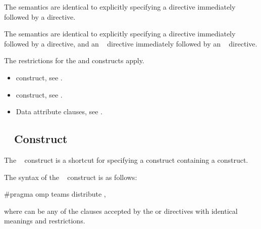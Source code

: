 \descr
\ccppspecificstart
The semantics are identical to explicitly specifying a  directive immediately 
followed by a  directive.
\ccppspecificend

\fortranspecificstart
The semantics are identical to explicitly specifying a  directive immediately 
followed by a  directive, and an ~ directive immediately followed by 
an ~ directive.
\fortranspecificend

\restrictions
The restrictions for the  and  constructs apply.

\crossreferences
\begin{itemize}
\item {} construct, see 
.

\item {} construct, see 
.

\item Data attribute clauses, see 
.
\end{itemize}









\subsection{~ Construct}
\label{subsec:teams distribute Construct}
\summary
The ~ construct is a shortcut for specifying a  construct 
containing a  construct.

\syntax
The syntax of the ~ construct is as follows:

\ccppspecificstart
\begin{boxedcode}
\#pragma omp teams distribute \plc{[clause[ [},\plc{] clause] ... ]}
\end{boxedcode}

where  can be any of the clauses accepted by the  or  
directives with identical meanings and restrictions.
\ccppspecificend

